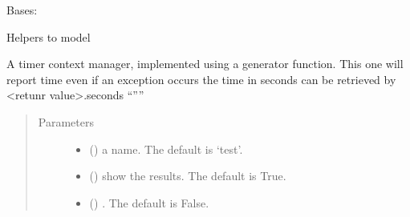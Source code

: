 \documentclass[letterpaper,10pt,english]{sphinxmanual}
\begin{document}
\begin{fulllineitems}
\label{\detokenize{core/modelclass:modelclass.Model_help_Mixin}}
\pysigstartsignatures
{}
\pysigstopsignatures
\sphinxAtStartPar
Bases: 

\sphinxAtStartPar
Helpers to model

\begin{fulllineitems}
\label{\detokenize{core/modelclass:modelclass.Model_help_Mixin.timer}}
\pysigstartsignatures
{}
\pysigstopsignatures
\sphinxAtStartPar
A timer context manager, implemented using a
generator function. This one will report time even if an exception occurs
the time in seconds can be retrieved by \textless{}retunr value\textgreater{}.seconds “””
\begin{quote}\begin{description}
\item[{Parameters}] \leavevmode\begin{itemize}
\item {} 
\sphinxAtStartPar
{} (\sphinxstyleliteralemphasis{\sphinxupquote{, }}) \textendash{} a name. The default is ‘test’.

\item {} 
\sphinxAtStartPar
{} (\sphinxstyleliteralemphasis{\sphinxupquote{, }}) \textendash{} show the results. The default is True.

\item {} 
\sphinxAtStartPar
{} (\sphinxstyleliteralemphasis{\sphinxupquote{, }}) \textendash{} . The default is False.


\end{itemize}
\end{description}
\end{quote}
\end{fulllineitems}
\end{fulllineitems}
\end{document}
